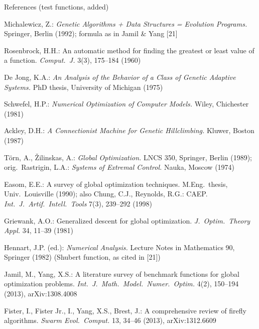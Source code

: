 \documentclass[aspectratio=169,11pt]{beamer}
\begin{document}
\begin{frame}[t]{References (test functions, added)}
\scriptsize
\begin{list}{}{\setlength{\leftmargin}{2.2em}\setlength{\itemindent}{-2.2em}\setlength{\itemsep}{0.15em}\setlength{\topsep}{0pt}}
\item[] [12] Michalewicz, Z.: \emph{Genetic Algorithms + Data Structures = Evolution Programs.} Springer, Berlin (1992); formula as in Jamil \& Yang [21]
\item[] [13] Rosenbrock, H.H.: An automatic method for finding the greatest or least value of a function. \emph{Comput.\ J.} 3(3), 175--184 (1960)
\item[] [14] De Jong, K.A.: \emph{An Analysis of the Behavior of a Class of Genetic Adaptive Systems.} PhD thesis, University of Michigan (1975)
\item[] [15] Schwefel, H.P.: \emph{Numerical Optimization of Computer Models.} Wiley, Chichester (1981)
\item[] [16] Ackley, D.H.: \emph{A Connectionist Machine for Genetic Hillclimbing.} Kluwer, Boston (1987)
\item[] [17] Törn, A., Žilinskas, A.: \emph{Global Optimization.} LNCS 350, Springer, Berlin (1989); orig.\ Rastrigin, L.A.: \emph{Systems of Extremal Control.} Nauka, Moscow (1974)
\item[] [18] Easom, E.E.: A survey of global optimization techniques. M.Eng.\ thesis, Univ.\ Louisville (1990); also Chung, C.J., Reynolds, R.G.: CAEP. \emph{Int.\ J.\ Artif.\ Intell.\ Tools} 7(3), 239--292 (1998)
\item[] [19] Griewank, A.O.: Generalized descent for global optimization. \emph{J.\ Optim.\ Theory Appl.} 34, 11--39 (1981)
\item[] [20] Hennart, J.P. (ed.): \emph{Numerical Analysis.} Lecture Notes in Mathematics 90, Springer (1982) (Shubert function, as cited in [21])
\item[] [21] Jamil, M., Yang, X.S.: A literature survey of benchmark functions for global optimization problems. \emph{Int.\ J.\ Math.\ Model.\ Numer.\ Optim.} 4(2), 150--194 (2013), arXiv:1308.4008
\item[] [22] Fister, I., Fister Jr., I., Yang, X.S., Brest, J.: A comprehensive review of firefly algorithms. \emph{Swarm Evol.\ Comput.} 13, 34--46 (2013), arXiv:1312.6609
\end{list}
\end{frame}
\end{document}
